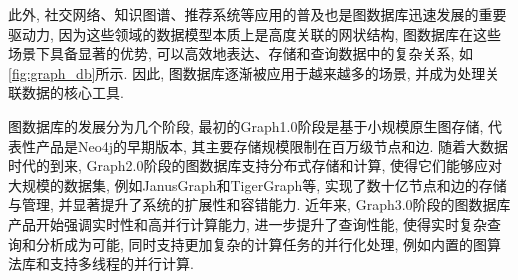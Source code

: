 此外, 社交网络、知识图谱、推荐系统等应用的普及也是图数据库迅速发展的重要驱动力, 因为这些领域的数据模型本质上是高度关联的网状结构, 图数据库在这些场景下具备显著的优势, 可以高效地表达、存储和查询数据中的复杂关系, 如\cref{fig:graph_db}所示. 因此, 图数据库逐渐被应用于越来越多的场景, 并成为处理关联数据的核心工具.

图数据库的发展分为几个阶段, 最初的Graph1.0阶段是基于小规模原生图存储, 代表性产品是Neo4j的早期版本, 其主要存储规模限制在百万级节点和边. 随着大数据时代的到来, Graph2.0阶段的图数据库支持分布式存储和计算, 使得它们能够应对大规模的数据集, 例如JanusGraph和TigerGraph等, 实现了数十亿节点和边的存储与管理, 并显著提升了系统的扩展性和容错能力. 近年来, Graph3.0阶段的图数据库产品开始强调实时性和高并行计算能力, 进一步提升了查询性能, 使得实时复杂查询和分析成为可能, 同时支持更加复杂的计算任务的并行化处理, 例如内置的图算法库和支持多线程的并行计算.

